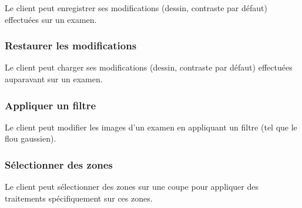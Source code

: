Le client peut enregistrer ses modifications (dessin, contraste par défaut) effectuées sur un examen.

\subsubsection{Restaurer les modifications}

Le client peut charger ses modifications (dessin, contraste par défaut) effectuées auparavant sur un examen.

\subsubsection{Appliquer un filtre}

Le client peut modifier les images d'un examen en appliquant un filtre (tel que le flou gaussien).

\subsubsection{Sélectionner des zones}

Le client peut sélectionner des zones sur une coupe pour appliquer des traitements spécifiquement sur ces
zones.